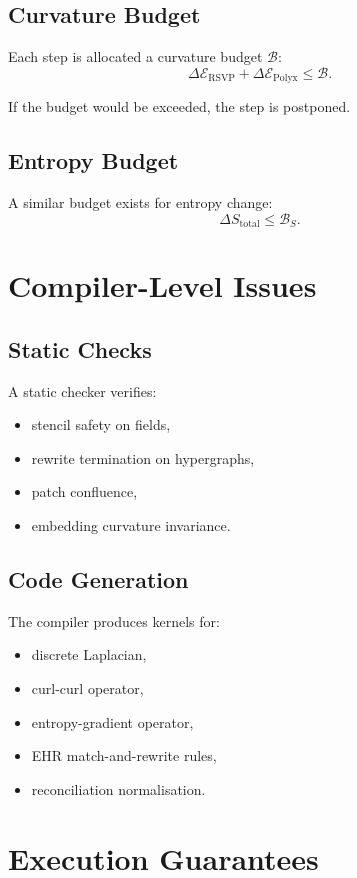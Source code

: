 \subsection{Curvature Budget}

Each step is allocated a curvature budget $\mathcal{B}$:
\[
\Delta\mathcal{E}_{\mathrm{RSVP}} + 
\Delta\mathcal{E}_{\mathrm{Polyx}} \le \mathcal{B}.
\]

If the budget would be exceeded, the step is postponed.

\subsection{Entropy Budget}

A similar budget exists for entropy change:
\[
\Delta S_{\mathrm{total}} \le \mathcal{B}_{S}.
\]

\section{Compiler-Level Issues}

\subsection{Static Checks}

A static checker verifies:
\begin{itemize}
\item stencil safety on fields,
\item rewrite termination on hypergraphs,
\item patch confluence,
\item embedding curvature invariance.
\end{itemize}

\subsection{Code Generation}

The compiler produces kernels for:
\begin{itemize}
\item discrete Laplacian,
\item curl-curl operator,
\item entropy-gradient operator,
\item EHR match-and-rewrite rules,
\item reconciliation normalisation.
\end{itemize}

\section{Execution Guarantees}

